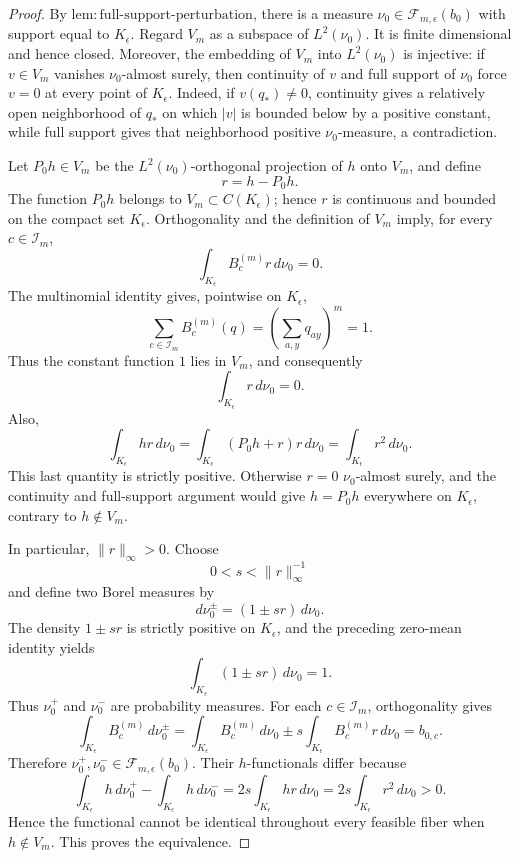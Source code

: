 \documentclass{article}
\begin{document}
\begin{proof}
By \(\mathrm{lem{:}full\text{-}support\text{-}perturbation}\), there is a measure \(\nu_0\in\mathcal F_{m,\epsilon}(b_0)\) with support equal to \(K_{\epsilon}\). Regard \(V_m\) as a subspace of \(L^2(\nu_0)\). It is finite dimensional and hence closed. Moreover, the embedding of \(V_m\) into \(L^2(\nu_0)\) is injective: if \(v\in V_m\) vanishes \(\nu_0\)-almost surely, then continuity of \(v\) and full support of \(\nu_0\) force \(v=0\) at every point of \(K_{\epsilon}\). Indeed, if \(v(q_*)\ne0\), continuity gives a relatively open neighborhood of \(q_*\) on which \(|v|\) is bounded below by a positive constant, while full support gives that neighborhood positive \(\nu_0\)-measure, a contradiction.

Let \(P_0h\in V_m\) be the \(L^2(\nu_0)\)-orthogonal projection of \(h\) onto \(V_m\), and define
\[
r=h-P_0h.
\]
The function \(P_0h\) belongs to \(V_m\subset C(K_{\epsilon})\); hence \(r\) is continuous and bounded on the compact set \(K_{\epsilon}\). Orthogonality and the definition of \(V_m\) imply, for every \(c\in\mathcal I_m\),
\[
\int_{K_{\epsilon}}B_c^{(m)}r\,d\nu_0=0.
\]
The multinomial identity gives, pointwise on \(K_{\epsilon}\),
\[
\sum_{c\in\mathcal I_m}B_c^{(m)}(q)
=\left(\sum_{a,y}q_{ay}\right)^m
=1.
\]
Thus the constant function \(1\) lies in \(V_m\), and consequently
\[
\int_{K_{\epsilon}}r\,d\nu_0=0.
\]
Also,
\[
\int_{K_{\epsilon}}hr\,d\nu_0
=\int_{K_{\epsilon}}(P_0h+r)r\,d\nu_0
=\int_{K_{\epsilon}}r^2\,d\nu_0.
\]
This last quantity is strictly positive. Otherwise \(r=0\) \(\nu_0\)-almost surely, and the continuity and full-support argument would give \(h=P_0h\) everywhere on \(K_{\epsilon}\), contrary to \(h\notin V_m\).

In particular, \(\lVert r\rVert_{\infty}>0\). Choose
\[
0<s<\lVert r\rVert_{\infty}^{-1}
\]
and define two Borel measures by
\[
d\nu_0^{\pm}=(1\pm sr)\,d\nu_0.
\]
The density \(1\pm sr\) is strictly positive on \(K_{\epsilon}\), and the preceding zero-mean identity yields
\[
\int_{K_{\epsilon}}(1\pm sr)\,d\nu_0=1.
\]
Thus \(\nu_0^+\) and \(\nu_0^-\) are probability measures. For each \(c\in\mathcal I_m\), orthogonality gives
\[
\int_{K_{\epsilon}}B_c^{(m)}\,d\nu_0^{\pm}
=\int_{K_{\epsilon}}B_c^{(m)}\,d\nu_0
 \pm s\int_{K_{\epsilon}}B_c^{(m)}r\,d\nu_0
=b_{0,c}.
\]
Therefore \(\nu_0^+,\nu_0^-\in\mathcal F_{m,\epsilon}(b_0)\). Their \(h\)-functionals differ because
\[
\int_{K_{\epsilon}}h\,d\nu_0^+
-\int_{K_{\epsilon}}h\,d\nu_0^-
=2s\int_{K_{\epsilon}}hr\,d\nu_0
=2s\int_{K_{\epsilon}}r^2\,d\nu_0
>0.
\]
Hence the functional cannot be identical throughout every feasible fiber when \(h\notin V_m\). This proves the equivalence.


\end{proof}
\end{document}
